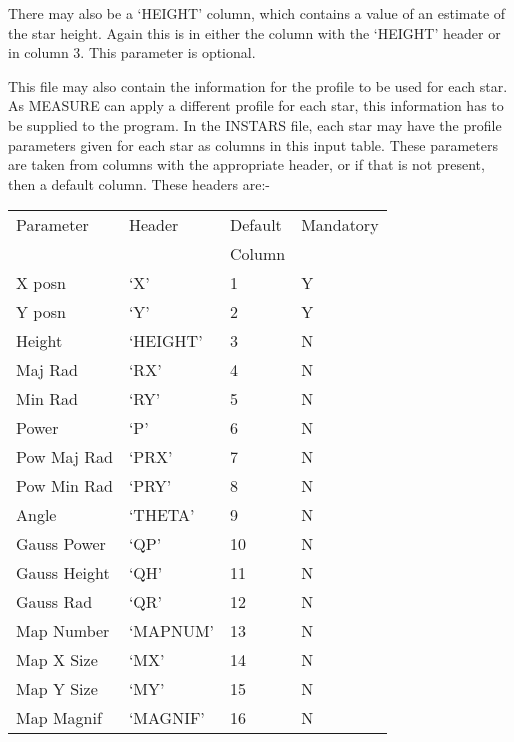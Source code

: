 \begin{small}
{{  There may also be a `HEIGHT' column, which contains a value of
  an estimate of the star height. Again this is in either the column with
  the `HEIGHT' header or in column 3. This parameter is optional.
 
  This file may also contain the information for the profile to be
  used for each star. As MEASURE can apply a different profile for
  each star, this information has to be supplied to the program. In the
  INSTARS file, each star may have the profile parameters given for
  each star as columns in this input table. These parameters are taken
  from columns with the appropriate header, or if that is not present, then
  a default column. These headers are:-
 
\vspace*{2mm}\begin{tabular}{|l|l|l|l|}\hline
    Parameter   &    Header     &  Default        &  Mandatory \\
                &               &  Column         & \\   \hline
    X posn      &    `X'        &     1           &     Y \\
    Y posn      &    `Y'        &     2           &     Y \\
    Height      &    `HEIGHT'   &     3           &     N \\
    Maj Rad     &    `RX'       &     4           &     N \\
    Min Rad     &    `RY'       &     5           &     N \\
    Power       &    `P'        &     6           &     N \\
    Pow Maj Rad &    `PRX'      &     7           &     N \\
    Pow Min Rad &    `PRY'      &     8           &     N \\
    Angle       &    `THETA'    &     9           &     N \\
    Gauss Power &    `QP'       &    10           &     N \\
    Gauss Height&    `QH'       &    11           &     N \\
    Gauss Rad   &    `QR'       &    12           &     N \\
    Map Number  &    `MAPNUM'   &    13           &     N \\
    Map X Size  &    `MX'       &    14           &     N \\
    Map Y Size  &    `MY'       &    15           &     N \\
    Map Magnif  &    `MAGNIF'   &    16           &     N \\
\hline\end{tabular}\vspace*{2mm}
 
}}
\end{small}

